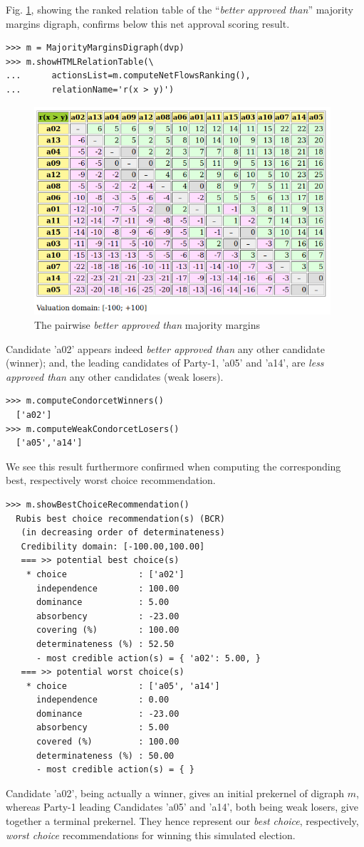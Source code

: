 Fig. \ref{fig:21.2}, showing the \NetFlows ranked relation table of the ``\emph{better approved than}'' majority margins digraph, confirms below this net approval scoring result.
\begin{lstlisting}
>>> m = MajorityMarginsDigraph(dvp)
>>> m.showHTMLRelationTable(\
...      actionsList=m.computeNetFlowsRanking(),
...      relationName='r(x > y)')
\end{lstlisting}	   
\begin{figure}[h]
\includegraphics[width=11cm]{Figures/majMargDAV.png}
\caption{The pairwise \emph{better approved than} majority margins} 
\label{fig:21.2}       %
\end{figure}
Candidate 'a02' appears indeed \emph{better approved than} any other candidate (\Condorcet winner); and, the leading candidates of Party-1, 'a05' and 'a14', are \emph{less approved than} any other candidates (weak \Condorcet losers).
\begin{lstlisting}
>>> m.computeCondorcetWinners()
  ['a02']
>>> m.computeWeakCondorcetLosers()
  ['a05','a14']
\end{lstlisting}

We see this result furthermore confirmed when computing the corresponding best, respectively worst choice recommendation.    
\begin{lstlisting}
>>> m.showBestChoiceRecommendation()
  Rubis best choice recommendation(s) (BCR)
   (in decreasing order of determinateness)   
   Credibility domain: [-100.00,100.00]
   === >> potential best choice(s)
    * choice              : ['a02']
      independence        : 100.00
      dominance           : 5.00
      absorbency          : -23.00
      covering (%)        : 100.00
      determinateness (%) : 52.50
      - most credible action(s) = { 'a02': 5.00, }
   === >> potential worst choice(s) 
    * choice              : ['a05', 'a14']
      independence        : 0.00
      dominance           : -23.00
      absorbency          : 5.00
      covered (%)         : 100.00
      determinateness (%) : 50.00
      - most credible action(s) = { }
\end{lstlisting}
Candidate 'a02', being actually a \Condorcet winner, gives an initial prekernel of digraph $m$, whereas Party-1 leading Candidates 'a05' and 'a14', both being weak \Condorcet losers, give together a terminal prekernel. They hence represent our \emph{best choice}, respectively, \emph{worst choice} recommendations for winning this simulated election.

